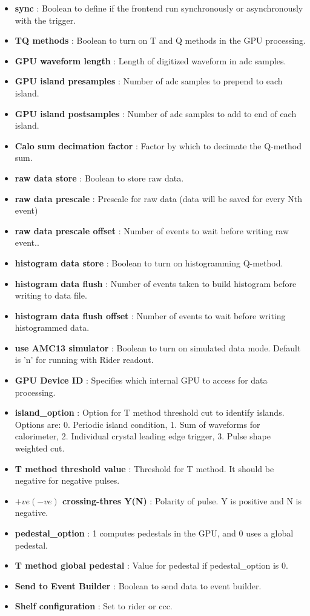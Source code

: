 \begin{itemize}
\item {\bf sync} : Boolean to define if the frontend run synchronously or asynchronously with the trigger.
\item {\bf TQ methods} : Boolean to turn on T and Q methods in the GPU processing.
\item {\bf GPU waveform length} : Length of digitized waveform in adc samples.
\item {\bf GPU island presamples} : Number of adc samples to prepend to each island.
\item {\bf GPU island postsamples} : Number of adc samples to add to end of each island.
\item {\bf Calo sum decimation factor} : Factor by which to decimate the Q-method sum.
\item {\bf raw data store} : Boolean to store raw data.
\item {\bf raw data prescale} : Prescale for raw data (data will be saved for every Nth event)
\item {\bf raw data prescale offset} : Number of events to wait before writing raw event..
\item {\bf histogram data store} : Boolean to turn on histogramming Q-method.
\item {\bf histogram data flush} : Number of events taken to build histogram before writing to data file.
\item {\bf histogram data flush offset} : Number of events to wait before writing histogrammed data.
\item {\bf use AMC13 simulator} : Boolean to turn on simulated data mode. Default is 'n' for running with Rider readout.
\item {\bf GPU Device ID} : Specifies which internal GPU to access for data processing. 
\item {\bf island\_option} : Option for T method threshold cut to identify islands. Options are: 0. Periodic island condition, 1. Sum of waveforms for calorimeter, 2. Individual crystal leading edge trigger, 3. Pulse shape weighted cut.
\item {\bf T method threshold value} : Threshold for T method. It should be negative for negative pulses.
\item {\bf $+ve(-ve)$ crossing-thres Y(N)} : Polarity of pulse. Y is positive and N is negative.
\item {\bf pedestal\_option} : 1 computes pedestals in the GPU, and 0 uses a global pedestal.
\item {\bf T method global pedestal} : Value for pedestal if pedestal\_option is 0. 
\item {\bf Send to Event Builder} : Boolean to send data to event builder.
\item {\bf Shelf configuration} : Set to rider or ccc.
\end{itemize}


